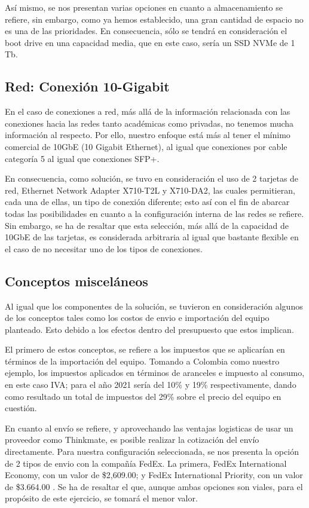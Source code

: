 \documentclass[conference,onecolumn]{IEEEtran}
\begin{document}
Así mismo, se nos presentan varias opciones en cuanto a almacenamiento se refiere, sin embargo, como ya hemos establecido, una gran cantidad de espacio no es una de las prioridades. En consecuencia, sólo se tendrá en consideración el boot drive en una capacidad media, que en este caso, sería un SSD NVMe de 1 Tb. 

\subsection{Red: Conexión 10-Gigabit}
En el caso de conexiones a red, más allá de la información relacionada con las conexiones hacia las redes tanto académicas como privadas, no tenemos mucha información al respecto. Por ello, nuestro enfoque está más al tener el mínimo comercial de 10GbE (10 Gigabit Ethernet), al igual que conexiones por cable categoría 5 al igual que conexiones SFP+. \medbreak

En consecuencia, como solución, se tuvo en consideración el uso de 2 tarjetas de red, Ethernet Network Adapter X710-T2L y X710-DA2, las cuales permitieran, cada una de ellas, un tipo de conexión diferente; esto así con el fin de abarcar todas las posibilidades en cuanto a la configuración interna de las redes se refiere. Sin embargo, se ha de resaltar que esta selección, más allá de la capacidad de 10GbE de las tarjetas, es considerada arbitraria al igual que bastante flexible en el caso de no necesitar uno de los tipos de conexiones.

\subsection{Conceptos misceláneos}
Al igual que los componentes de la solución, se tuvieron en consideración algunos de los conceptos tales como los costos de envio e importación del equipo planteado. Esto debido a los efectos dentro del presupuesto que estos implican. \medbreak

El primero de estos conceptos, se refiere a los impuestos que se aplicarían en términos de la importación del equipo. Tomando a Colombia como nuestro ejemplo, los impuestos aplicados en términos de aranceles e impuesto al consumo, en este caso IVA; para el año 2021 sería del 10\% \cite{mincit} y 19\%\cite{rci} respectivamente, dando como resultado un total de impuestos del 29\% sobre el precio del equipo en cuestión.

En cuanto al envío se refiere, y aprovechando las ventajas logisticas de usar un proveedor como Thinkmate, es posible realizar la cotización del envío directamente. Para nuestra configuración seleccionada, se nos presenta la opción de 2 tipos de envio con la compañía FedEx. La primera, FedEx International Economy, con un valor de \$2,609.{\small00}; y FedEx International Priority, con un valor de \$3.664.{\small00} \cite{thinkmateHP}. Se ha de resaltar el que, aunque ambas opciones son viales, para el propósito de este ejercicio, se tomará el menor valor.
\end{document}
